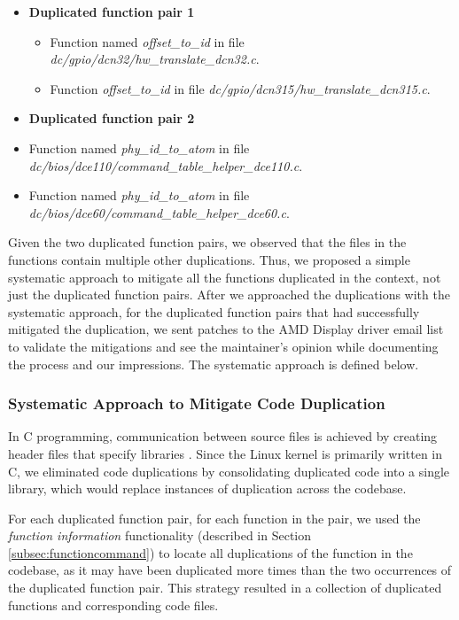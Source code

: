 \begin{itemize}
\item \textbf{Duplicated function pair 1}
\begin{itemize}
\item Function named \textit{offset\_to\_id} in file \textit{dc/gpio/dcn32/hw\_translate\_dcn32.c}.
\item Function \textit{offset\_to\_id} in file \textit{dc/gpio/dcn315/hw\_translate\_dcn315.c}.
\end{itemize}
\item \textbf{Duplicated function pair 2}
\item Function named \textit{phy\_id\_to\_atom} in file \textit{dc/bios/dce110/command\_table\_helper\_dce110.c}.
\item Function named \textit{phy\_id\_to\_atom} in file \textit{dc/bios/dce60/command\_table\_helper\_dce60.c}.
\end{itemize}

Given the two duplicated function pairs, we observed that the files in the functions 
contain multiple other duplications. Thus, we proposed a simple systematic approach 
to mitigate all the functions duplicated in the context, not just the duplicated 
function pairs. 
After we approached the duplications with the systematic approach, for the duplicated 
function pairs that had successfully mitigated the duplication, we sent patches to the 
AMD Display driver email list to validate the mitigations and see the maintainer's opinion 
while documenting the process and our impressions.
The systematic approach is defined below.

\subsubsection{Systematic Approach to Mitigate Code Duplication}
\label{subsubsec:systematic}

In C programming, communication between source files is achieved by creating header files that specify 
libraries \citep{Cbook}. Since the Linux kernel is primarily written in C, we eliminated code duplications 
by consolidating duplicated code into a single library, which would replace instances of 
duplication across the codebase.

For each duplicated function pair, for each function in the pair, we used the \textit{function information} functionality 
(described in Section \ref{subsec:functioncommand}) to locate all duplications of the function in the codebase, 
as it may have been duplicated more times than the two occurrences of the duplicated function pair. 
This strategy resulted in a collection of duplicated functions and corresponding code files.

